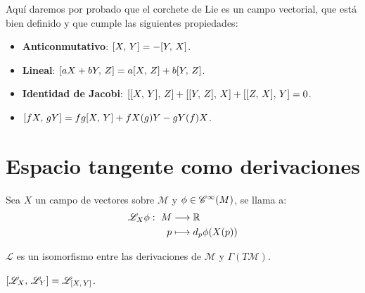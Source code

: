 Aquí daremos por probado que el corchete de Lie es un campo vectorial, que está bien definido y que cumple las
siguientes propiedades:
\begin{itemize}
  \item \textbf{Anticonmutativo}: $[X,\thinspace Y]=-[Y,\thinspace X]$.
  \item \textbf{Lineal}: $[aX+bY,\thinspace Z]=a[X,\thinspace Z]+b[Y,\thinspace Z]$.
  \item \textbf{Identidad de Jacobi}: $[[X,\thinspace Y],\thinspace Z]+[[Y,\thinspace Z],\thinspace X]+[[Z,\thinspace X],\thinspace Y]=0$.
  \item $[fX,\thinspace gY]=fg[X,\thinspace Y]+fX(g)Y-gY(f)X$.
\end{itemize}
\section{Espacio tangente como derivaciones}\label{sec:espacio-tangente-como-derivaciones}

\begin{definition}
  Sea $X$ un campo de vectores sobre $\mathcal{M}$ y $\phi\in\mathscr{C}^\infty(M)$, se llama  a:
  \begin{equation}
    \label{eq:derivada-lie-funcion-campo}
    \begin{alignedat}{1}
      \mathscr{L}_X \phi:\ M & \longrightarrow \mathbb{R} \\ p & \longmapsto d_p \phi(X(p))
    \end{alignedat}
  \end{equation}
\end{definition}

\begin{proposition}
  $\mathscr{L}$ es un isomorfismo entre las derivaciones de $\mathcal{M}$ y $\Gamma(T\mathcal{M})$.
\end{proposition}

\begin{proposition}
  $[\mathscr{L}_X,\thinspace \mathscr{L}_Y]=\mathscr{L}_{[X,\thinspace Y]}$.
\end{proposition}